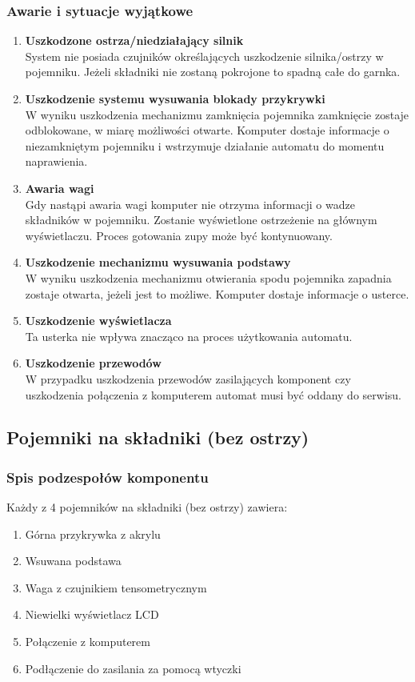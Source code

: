 \documentclass[12pt,a4paper,notitlepage]{article}
\begin{document}
\subsubsection{Awarie i sytuacje wyjątkowe}
\begin{enumerate}
  \item \textbf{Uszkodzone ostrza/niedziałający silnik}\\
System nie posiada czujników określających uszkodzenie silnika/ostrzy w pojemniku. Jeżeli składniki nie zostaną pokrojone to spadną całe do garnka.
  \item \textbf{Uszkodzenie systemu wysuwania blokady przykrywki}\\
W wyniku uszkodzenia mechanizmu zamknięcia pojemnika zamknięcie zostaje odblokowane, w miarę możliwości otwarte. Komputer dostaje informacje o niezamkniętym pojemniku i wstrzymuje działanie automatu do momentu naprawienia.
  \item \textbf{Awaria wagi}\\
Gdy nastąpi awaria wagi komputer nie otrzyma informacji o wadze składników w pojemniku. Zostanie wyświetlone ostrzeżenie na głównym wyświetlaczu. Proces gotowania zupy może być kontynuowany.
  \item \textbf{Uszkodzenie mechanizmu wysuwania podstawy}\\
W wyniku uszkodzenia mechanizmu otwierania spodu pojemnika zapadnia zostaje otwarta, jeżeli jest to możliwe. Komputer dostaje informacje o usterce.
  \item \textbf{Uszkodzenie wyświetlacza}\\
Ta usterka nie wpływa znacząco na proces użytkowania automatu.
  \item \textbf{Uszkodzenie przewodów}\\
W przypadku uszkodzenia przewodów zasilających komponent czy uszkodzenia połączenia z komputerem automat musi być oddany do serwisu.
\end{enumerate}


\subsection{Pojemniki na składniki (bez ostrzy)}
\subsubsection{Spis podzespołów komponentu}
Każdy z 4 pojemników na składniki (bez ostrzy) zawiera:
\begin{enumerate}
  \item Górna przykrywka z akrylu
  \item Wsuwana podstawa
  \item Waga z czujnikiem tensometrycznym
  \item Niewielki wyświetlacz LCD
  \item Połączenie z komputerem
  \item Podłączenie do zasilania za pomocą wtyczki
\end{enumerate}
\end{document}
